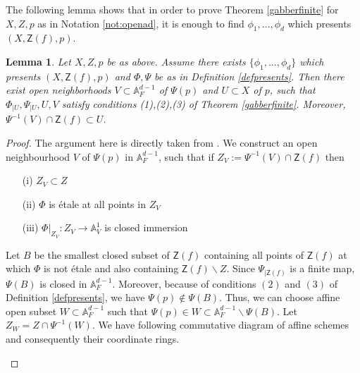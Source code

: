 \documentclass[10pt]{amsart}
\theoremstyle{plain}
\newtheorem{lemma}[thm]{Lemma}
\theoremstyle{definition}
\newcommand{\A}{{\mathbb A}}
\let\syn\mathsf
\begin{document}
The following lemma shows that in order to prove Theorem \ref{gabberfinite} for $X,Z,p$ as in Notation \ref{not:openad}, it is enough to find $\phi_1,...,\phi_d$ which presents $(X,\syn{Z}(f),p)$. 
\begin{lemma}\label{nakarg} Let $X,Z,p$ be as above. Assume there exists $\{\phi_1,...,\phi_d\}$ which presents 
$(X,\syn{Z}(f),p)$ and $\Phi,\Psi$ be as in Definition \ref{defpresents}. Then there exist  open neighborhoods $V\subset \A^{d-1}_F$ of $\Psi(p)$ and $U\subset X$ of $p$, such that  $\Phi_{|U},\Psi_{|U},U, V$  satisfy conditions (1),(2),(3) of Theorem \ref{gabberfinite}.  Moreover, $\Psi^{-1}(V) \cap \syn{Z}(f)\subset U$.
\end{lemma}
\begin{proof} The argument here is directly taken from \cite[3.5.1]{chk}. We construct an open neighbourhood $V$ of  $\Psi(p)$ in  $\A^{d-1}_F$, such that 
if $Z_V:=\Psi^{-1}(V) \cap \syn{Z}(f)$ then 
\begin{enumerate}
 \item[(i)] $Z_V \subset Z$
 \item[(ii)] $\Phi$ is \'{e}tale at all points in $Z_V$ 
 \item[(iii)] $\Phi|_{Z_V}: Z_V \rightarrow \A^ 1_V $ is closed immersion
\end{enumerate}
Let $B$ be the smallest closed subset of $\syn{Z}(f)$ containing all points of $\syn{Z}(f)$ at which $\Phi$ is not \'{e}tale and also containing $\syn{Z}(f)\backslash Z$. Since $\Psi_{|\syn{Z}(f)}$ is a finite map, $\Psi(B)$ is closed in $\A^{d-1}_F$.  Moreover, because of conditions $(2)$ and $(3)$ of  Definition \ref{defpresents}, we have $\Psi(p) \notin \Psi(B)$. Thus, we can choose affine open subset $W \subset \A^{d-1}_F$ such that $\Psi(p) \in W \subset \A^{d-1}_F \backslash \Psi(B)$. Let $Z_W= Z\cap \Psi^{-1}(W)$. We have following commutative diagram of affine schemes and consequently their coordinate rings.


\begin{center}
\begin{minipage}{.4\textwidth}
\end{minipage}
\begin{minipage}{.2\textwidth}
\end{minipage}


\end{center}
\end{proof}
\end{document}
